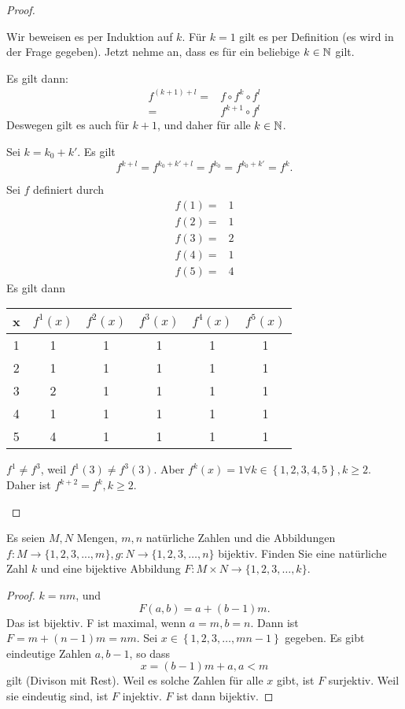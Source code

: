 \begin{proof}
	\begin{parts}
	\item Wir beweisen es per Induktion auf $k$. F\"{u}r $k=1$ gilt es per Definition (es wird in der Frage gegeben). Jetzt nehme an, dass es f\"{u}r ein beliebige $k\in\mathbb{N}$ gilt. 
	
		Es gilt dann:
		\begin{align*}
			f^{(k+1)+l}=&f\circ f^k\circ f^l\\
			=& f^{k+1}\circ f^l
		\end{align*}
		Deswegen gilt es auch f\"{u}r $k+1$, und daher f\"{u}r alle $k\in \mathbb{N}$.
	\item Sei $k=k_0+k'$. Es gilt
		\[
			f^{k+l}=f^{k_0+k'+l}=f^{k_0}=f^{k_0+k'}=f^k
		.\] 
	\item Sei $f$ definiert durch
		\begin{align*}
			f(1)=&1\\
			f(2)=&1\\
			f(3)=&2\\
			f(4)=&1\\
			f(5)=&4
		\end{align*}
		Es gilt dann
		\begin{center}
			\begin{tabular}{cccccc}
				\toprule
				x & $f^1(x)$ & $f^2(x)$ & $f^3(x)$ & $f^4(x)$ & $f^5(x)$\\\midrule
				1 & 1 & 1 & 1 & 1 & 1\\\midrule
				2 & 1 & 1 & 1 & 1 & 1\\\midrule
				3 & 2 & 1 & 1 & 1 & 1\\\midrule
				4 & 1 & 1 & 1 & 1 & 1\\\midrule
				5 & 4 & 1 & 1 & 1 & 1\\\bottomrule
			\end{tabular}
		\end{center}
		$f^1\neq f^3$, weil $f^1(3)\neq f^3(3)$. Aber $f^k(x)=1\forall k \in \left\{ 1,2,3,4,5 \right\} , k\ge 2$. Daher ist $f^{k+2}=f^k, k\ge 2$.\qedhere
	\end{parts}
\end{proof}
\begin{Problem}
	Es seien $M, N$ Mengen, $m, n$ nat\"{u}rliche Zahlen und die Abbildungen $f : M \to \{1, 2, 3, . . . , m\}, g : N \to \{1, 2, 3,\dots , n\}$ bijektiv. Finden Sie eine nat\"{u}rliche Zahl $k$ und eine bijektive Abbildung $F : M \times  N \to \{1, 2, 3, \dots , k\}$.
\end{Problem}
\begin{proof}
	$k=nm$, und
	\[
	F(a,b)=a+(b-1)m
	.\] 
	Das ist bijektiv. F ist maximal, wenn $a=m,b=n$. Dann ist  $F=m+(n-1)m=nm$. Sei $x\in \left\{ 1,2,3,\dots, mn-1 \right\} $ gegeben. Es gibt eindeutige Zahlen $a, b-1$, so dass
	\[
	x=(b-1)m+a, a<m
	\]
	gilt (Divison mit Rest). Weil es solche Zahlen f\"{u}r alle $x$ gibt, ist $F$ surjektiv. Weil sie eindeutig sind, ist $F$ injektiv. $F$ ist dann bijektiv.
\end{proof}
